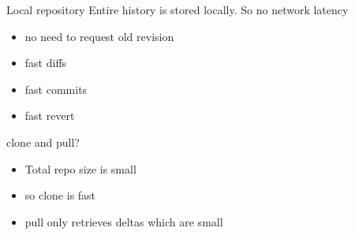 \begin{frame}
	\begin{block}{Local repository}
		Entire history is stored locally. So no network latency
		\begin{itemize}
			\item no need to request old revision
			\item fast diffs
			\item fast commits
			\item fast revert
		\end{itemize}
	\end{block}
	\begin{block}{clone and pull?}
		\begin{itemize}
			\item Total repo size is small
			\item so clone is fast
			\item pull only retrieves deltas which are small
		\end{itemize}
	\end{block}
\end{frame}
